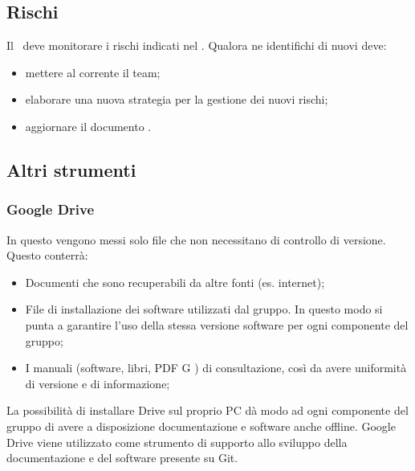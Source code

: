 \documentclass[../NormeDiProgetto.tex]{subfiles}
\begin{document}
		\subsection{Rischi}
			Il \responsabilediprogetto\ deve monitorare i rischi indicati nel \pianodiprogetto. Qualora ne identifichi di nuovi deve:
			\begin{itemize}
				\item mettere al corrente il team;
				\item elaborare una nuova strategia per la gestione dei nuovi rischi;
				\item aggiornare il documento \pianodiprogetto.
			\end{itemize}
		\subsection{Altri strumenti}
			\subsubsection{Google Drive}
				In questo  vengono messi solo file che non necessitano di controllo di versione.
				Questo  conterrà:
				\begin{itemize}
					\item Documenti che sono recuperabili da altre fonti (es. internet);
					\item File di installazione dei software utilizzati dal gruppo. In questo modo si punta a garantire l’uso della stessa versione software per ogni componente del gruppo;
					\item I manuali (software, libri, PDF G ) di consultazione, così da avere uniformità di versione e di informazione;
				\end{itemize}
				La possibilità di installare Drive sul proprio PC dà modo ad ogni componente del gruppo di avere a disposizione documentazione e software anche offline. Google Drive viene utilizzato come strumento di supporto allo sviluppo della documentazione e del software presente su Git.
\end{document}
